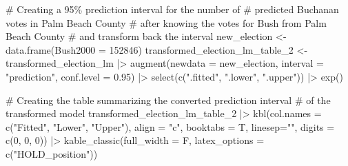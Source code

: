 \documentclass[
  letterpaper,
  DIV=11,
  numbers=noendperiod]{scrartcl}
\newenvironment{Shaded}{\begin{snugshade}}{\end{snugshade}}
\newcommand{\AttributeTok}[1]{\textcolor[rgb]{0.40,0.45,0.13}{#1}}
\newcommand{\CommentTok}[1]{\textcolor[rgb]{0.37,0.37,0.37}{#1}}
\newcommand{\DecValTok}[1]{\textcolor[rgb]{0.68,0.00,0.00}{#1}}
\newcommand{\FloatTok}[1]{\textcolor[rgb]{0.68,0.00,0.00}{#1}}
\newcommand{\FunctionTok}[1]{\textcolor[rgb]{0.28,0.35,0.67}{#1}}
\newcommand{\NormalTok}[1]{\textcolor[rgb]{0.00,0.23,0.31}{#1}}
\newcommand{\OtherTok}[1]{\textcolor[rgb]{0.00,0.23,0.31}{#1}}
\newcommand{\SpecialCharTok}[1]{\textcolor[rgb]{0.37,0.37,0.37}{#1}}
\newcommand{\StringTok}[1]{\textcolor[rgb]{0.13,0.47,0.30}{#1}}
\begin{document}
\begin{Shaded}
\begin{Highlighting}[]
\CommentTok{\# Creating a 95\% prediction interval for the number of}
\CommentTok{\# predicted Buchanan votes in Palm Beach County}
\CommentTok{\# after knowing the votes for Bush from Palm Beach County}
\CommentTok{\# and transform back the interval}
\NormalTok{new\_election }\OtherTok{\textless{}{-}} \FunctionTok{data.frame}\NormalTok{(}\AttributeTok{Bush2000 =} \DecValTok{152846}\NormalTok{)}
\NormalTok{transformed\_election\_lm\_table\_2 }\OtherTok{\textless{}{-}}\NormalTok{ transformed\_election\_lm }\SpecialCharTok{|\textgreater{}}
  \FunctionTok{augment}\NormalTok{(}\AttributeTok{newdata =}\NormalTok{ new\_election,}
          \AttributeTok{interval =} \StringTok{"prediction"}\NormalTok{,}
          \AttributeTok{conf.level =} \FloatTok{0.95}\NormalTok{) }\SpecialCharTok{|\textgreater{}}
  \FunctionTok{select}\NormalTok{(}\FunctionTok{c}\NormalTok{(}\StringTok{".fitted"}\NormalTok{, }\StringTok{".lower"}\NormalTok{, }\StringTok{".upper"}\NormalTok{)) }\SpecialCharTok{|\textgreater{}} \FunctionTok{exp}\NormalTok{()}

\CommentTok{\# Creating the table summarizing the converted prediction interval}
\CommentTok{\# of the transformed model}
\NormalTok{transformed\_election\_lm\_table\_2 }\SpecialCharTok{|\textgreater{}} \FunctionTok{kbl}\NormalTok{(}\AttributeTok{col.names =} \FunctionTok{c}\NormalTok{(}\StringTok{"Fitted"}\NormalTok{, }\StringTok{"Lower"}\NormalTok{,}
                                       \StringTok{"Upper"}\NormalTok{), }
                         \AttributeTok{align =} \StringTok{"c"}\NormalTok{,}
                         \AttributeTok{booktabs =}\NormalTok{ T,}
                         \AttributeTok{linesep=}\StringTok{""}\NormalTok{,}
                         \AttributeTok{digits =} \FunctionTok{c}\NormalTok{(}\DecValTok{0}\NormalTok{, }\DecValTok{0}\NormalTok{, }\DecValTok{0}\NormalTok{)) }\SpecialCharTok{|\textgreater{}}
  \FunctionTok{kable\_classic}\NormalTok{(}\AttributeTok{full\_width =}\NormalTok{ F, }\AttributeTok{latex\_options =} \FunctionTok{c}\NormalTok{(}\StringTok{"HOLD\_position"}\NormalTok{))}
\end{Highlighting}
\end{Shaded}
\end{document}
